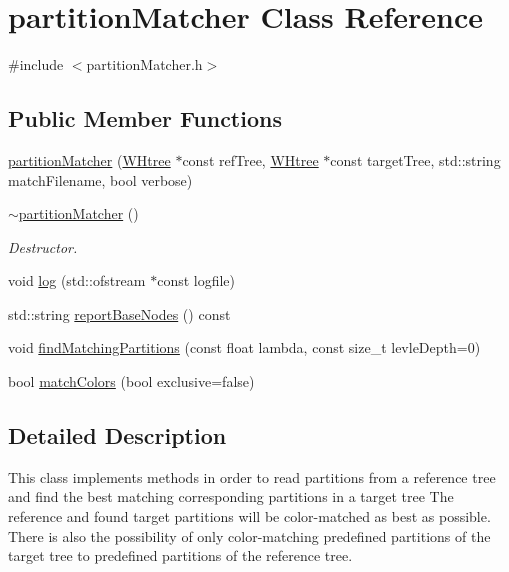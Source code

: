 \hypertarget{classpartitionMatcher}{\section{partition\-Matcher \-Class \-Reference}
\label{classpartitionMatcher}
}


{\ttfamily \#include $<$partition\-Matcher.\-h$>$}

\subsection*{\-Public \-Member \-Functions}
\begin{DoxyCompactItemize}
\item 
\hyperlink{classpartitionMatcher_a9fe85439b2abf35332a0e9ef2483e79d}{partition\-Matcher} (\hyperlink{classWHtree}{\-W\-Htree} $\ast$const ref\-Tree, \hyperlink{classWHtree}{\-W\-Htree} $\ast$const target\-Tree, std\-::string match\-Filename, bool verbose)
\item 
\hypertarget{classpartitionMatcher_a79f7a25dba1ffcd5931bb01c35312ac4}{\hyperlink{classpartitionMatcher_a79f7a25dba1ffcd5931bb01c35312ac4}{$\sim$partition\-Matcher} ()}\label{classpartitionMatcher_a79f7a25dba1ffcd5931bb01c35312ac4}

\begin{DoxyCompactList}\small\item\em \-Destructor. \end{DoxyCompactList}\item 
void \hyperlink{classpartitionMatcher_a1497cdb4681cd224b7830b4363e88c7c}{log} (std\-::ofstream $\ast$const logfile)
\item 
std\-::string \hyperlink{classpartitionMatcher_ae0afb1b4f459d4cbe8bc5406c7d24b80}{report\-Base\-Nodes} () const 
\item 
void \hyperlink{classpartitionMatcher_aacbb5c069c9cc9a0ef3de75ce1cd6d8d}{find\-Matching\-Partitions} (const float lambda, const size\-\_\-t levle\-Depth=0)
\item 
bool \hyperlink{classpartitionMatcher_a104cd76b4cf18c168811d4a43b909c88}{match\-Colors} (bool exclusive=false)
\end{DoxyCompactItemize}


\subsection{\-Detailed \-Description}
\-This class implements methods in order to read partitions from a reference tree and find the best matching corresponding partitions in a target tree \-The reference and found target partitions will be color-\/matched as best as possible. \-There is also the possibility of only color-\/matching predefined partitions of the target tree to predefined partitions of the reference tree. 

